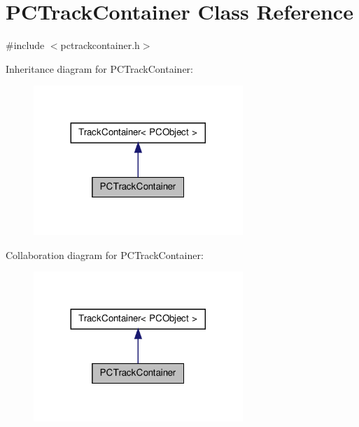 \hypertarget{class_p_c_track_container}{\section{\-P\-C\-Track\-Container \-Class \-Reference}
\label{class_p_c_track_container}
}


{\ttfamily \#include $<$pctrackcontainer.\-h$>$}



\-Inheritance diagram for \-P\-C\-Track\-Container\-:
\nopagebreak
\begin{figure}[H]
\begin{center}
\leavevmode
\includegraphics[width=224pt]{class_p_c_track_container__inherit__graph}
\end{center}
\end{figure}


\-Collaboration diagram for \-P\-C\-Track\-Container\-:
\nopagebreak
\begin{figure}[H]
\begin{center}
\leavevmode
\includegraphics[width=224pt]{class_p_c_track_container__coll__graph}
\end{center}
\end{figure}
